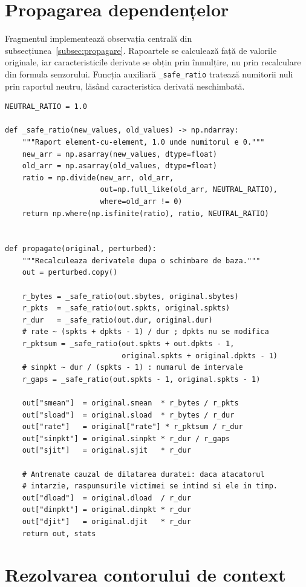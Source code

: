 \section{Propagarea dependențelor}\label{sec:anexa-propagare}

Fragmentul implementează observația centrală din subsecțiunea~\ref{subsec:propagare}. Rapoartele se calculează față de valorile originale, iar caracteristicile derivate se obțin prin înmulțire, nu prin recalculare din formula senzorului. Funcția auxiliară \verb|_safe_ratio| tratează numitorii nuli prin raportul neutru, lăsând caracteristica derivată neschimbată.

\begin{verbatim}
NEUTRAL_RATIO = 1.0

def _safe_ratio(new_values, old_values) -> np.ndarray:
    """Raport element-cu-element, 1.0 unde numitorul e 0."""
    new_arr = np.asarray(new_values, dtype=float)
    old_arr = np.asarray(old_values, dtype=float)
    ratio = np.divide(new_arr, old_arr,
                      out=np.full_like(old_arr, NEUTRAL_RATIO),
                      where=old_arr != 0)
    return np.where(np.isfinite(ratio), ratio, NEUTRAL_RATIO)


def propagate(original, perturbed):
    """Recalculeaza derivatele dupa o schimbare de baza."""
    out = perturbed.copy()

    r_bytes = _safe_ratio(out.sbytes, original.sbytes)
    r_pkts  = _safe_ratio(out.spkts, original.spkts)
    r_dur   = _safe_ratio(out.dur, original.dur)
    # rate ~ (spkts + dpkts - 1) / dur ; dpkts nu se modifica
    r_pktsum = _safe_ratio(out.spkts + out.dpkts - 1,
                           original.spkts + original.dpkts - 1)
    # sinpkt ~ dur / (spkts - 1) : numarul de intervale
    r_gaps = _safe_ratio(out.spkts - 1, original.spkts - 1)

    out["smean"]  = original.smean  * r_bytes / r_pkts
    out["sload"]  = original.sload  * r_bytes / r_dur
    out["rate"]   = original["rate"] * r_pktsum / r_dur
    out["sinpkt"] = original.sinpkt * r_dur / r_gaps
    out["sjit"]   = original.sjit   * r_dur

    # Antrenate cauzal de dilatarea duratei: daca atacatorul
    # intarzie, raspunsurile victimei se intind si ele in timp.
    out["dload"]  = original.dload  / r_dur
    out["dinpkt"] = original.dinpkt * r_dur
    out["djit"]   = original.djit   * r_dur
    return out, stats
\end{verbatim}

\section{Rezolvarea contorului de context}\label{sec:anexa-ct}

